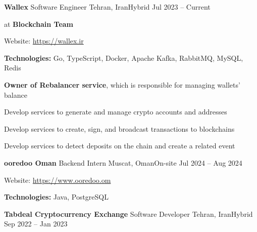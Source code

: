 \documentclass[]{awesome-cv}
\begin{document}
\vspace{-7mm}
\begin{cventries}
	\cventry
	{\textbf{Wallex}}
	{Software Engineer}
	{Tehran, Iran{\enskip\cdotp\enskip}Hybrid}
	{Jul 2023 – Current}
	{\begin{cvitems}
		\vspace{1mm}
		\item[] {\hspace{-9mm}} at \textbf{Blockchain Team}
		\vspace{1mm}
		\item[] {\hspace{-9mm} Website: \href{https://wallex.ir}{\textcolor{awesome}{https://wallex.ir}}}
		\vspace{1mm}
		\item {\textbf{Technologies:} Go, TypeScript, Docker, Apache Kafka, RabbitMQ, MySQL, Redis}
            \vspace{1mm}
		\item {\textbf{Owner of Rebalancer service}, which is responsible for managing wallets' balance}
		\vspace{1mm}
		\item {Develop services to generate and manage crypto accounts and addresses}
		\vspace{1mm}
		\item {Develop services to create, sign, and broadcast transactions to blockchains}
		\vspace{1mm}
		\item {Develop services to detect deposits on the chain and create a related event}
	\end{cvitems}}
        \cventry
	{\textbf{ooredoo Oman}}
	{Backend Intern}
	{Muscat, Oman{\enskip\cdotp\enskip}On-site}
	{Jul 2024 – Aug 2024}
	{\begin{cvitems}
        \vspace{1mm}
	\item[] {\hspace{-9mm} Website: \href{https://www.ooredoo.om}{\textcolor{awesome}{https://www.ooredoo.om}}}
		\vspace{1mm}
		\item {\textbf{Technologies:} Java, PostgreSQL}
	\end{cvitems}}
	\cventry
	{\textbf{Tabdeal Cryptocurrency Exchange}}
	{Software Developer}
	{Tehran, Iran{\enskip\cdotp\enskip}Hybrid}
	{Sep 2022 – Jan 2023}

\end{cventries}
\end{document}
